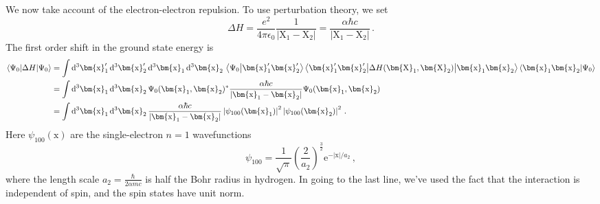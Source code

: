 \documentclass{article}
\theoremstyle{plain}\theoremheaderfont{\normalfont\itshape}\theorembodyfont{\rmfamily}\theoremseparator{.}\newtheorem*{rem}{Remark}\newtheorem*{ex}{Example}\newtheorem*{proof}{Proof}\newtheorem*{altp}{Alternative proof}
\theoremstyle{plain}\theoremheaderfont{\normalfont\bfseries}\theorembodyfont{\rmfamily}\theoremseparator{.}\newtheorem{thm}{Theorem}[section]\newtheorem{lem}[thm]{Lemma}\newtheorem{prop}[thm]{Proposition}\newtheorem*{cor}{Corollary}\newtheorem{defn}[thm]{Definition}\newtheorem{clm}[thm]{Claim}\newtheorem{clminproof}{Claim}
\theoremstyle{break}\theoremheaderfont{\normalfont\itshape}\theorembodyfont{\rmfamily}\theoremseparator{.\medskip}\newtheorem*{proofskip}{Proof}\newtheorem*{exs}{Examples}\newtheorem*{rems}{Remarks}
\theoremstyle{break}\theoremheaderfont{\normalfont\bfseries}\theorembodyfont{\rmfamily}\theoremseparator{.\medskip}\newtheorem{lemskip}[thm]{Lemma}\newtheorem{defnskip}[thm]{Definition}\newtheorem{propskip}[thm]{Proposition}\newtheorem{thmskip}[thm]{Theorem}
\numberwithin{equation}{section}
\newcommand{\ee}{\mathrm{e}}
\newcommand{\dd}[2][]{\mathrm{d}^{#1} #2\,}
\newcommand{\braket}[2]{\left\langle #1 \middle| #2 \right\rangle}
\newcommand{\mel}[3]{\left\langle #1 \middle| #2 \middle| #3 \right\rangle}
\newcommand{\vb}[1]{\bm{\mathrm{#1}}}
\newcommand{\abs}[1]{\left| #1 \right|}
\begin{document}
    We now take account of the electron-electron repulsion. To use perturbation theory, we set
    \begin{equation}
        \Delta H=\frac{e^2}{4\pi\epsilon_0}\frac{1}{\abs{\vb{X}_1-\vb{X}_2}}=\frac{\alpha\hbar c}{\abs{\vb{X}_1-\vb{X}_2}}\,.
    \end{equation}
    The first order shift in the ground state energy is
    \begin{align}
        \mel{\Psi_0}{\Delta H}{\Psi_0}&=\int\dd[3]{\vb{x}_1'}\dd[3]{\vb{x}_2'}\dd[3]{\vb{x}_1}\dd[3]{\vb{x}_2}\braket{\Psi_0}{\vb{x}_1'\vb{x}_2'}\mel{\vb{x}_1'\vb{x}_2'}{\Delta H(\vb{X}_1,\vb{X}_2)}{\vb{x}_1\vb{x}_2}\braket{\vb{x}_1\vb{x}_2}{\Psi_0}\notag\\
        &=\int\dd[3]{\vb{x}_1}\dd[3]{\vb{x}_2}\Psi_0(\vb{x}_1,\vb{x}_2)^*\frac{\alpha\hbar c}{\abs{\vb{x}_1-\vb{x}_2}}\Psi_0(\vb{x}_1,\vb{x}_2)\notag\\
        &=\int\dd[3]{\vb{x}_1}\dd[3]{\vb{x}_2}\frac{\alpha\hbar c}{\abs{\vb{x}_1-\vb{x}_2}}\abs{\psi_{100}(\vb{x}_1)}^2\abs{\psi_{100}(\vb{x}_2)}^2\,.
    \end{align}
    Here \(\psi_{100}(\vb{x})\) are the single-electron \(n=1\) wavefunctions
    \begin{equation}
        \psi_{100}=\frac{1}{\sqrt{\pi}}\left(\frac{2}{a_2}\right)^{\frac{3}{2}}\ee^{-\abs{\vb{x}}/a_2}\,,
    \end{equation}
    where the length scale \(a_2=\frac{\hbar}{2\alpha mc}\) is half the Bohr radius in hydrogen. In going to the last line, we've used the fact that the interaction is independent of spin, and the spin states have unit norm.
\end{document}
